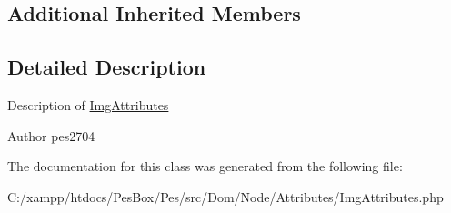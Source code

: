 \subsection*{Additional Inherited Members}


\subsection{Detailed Description}
Description of \mbox{\hyperlink{class_pes_1_1_dom_1_1_node_1_1_attributes_1_1_img_attributes}{Img\+Attributes}}

\begin{DoxyAuthor}{Author}
pes2704 
\end{DoxyAuthor}


The documentation for this class was generated from the following file\+:\begin{DoxyCompactItemize}
\item 
C\+:/xampp/htdocs/\+Pes\+Box/\+Pes/src/\+Dom/\+Node/\+Attributes/Img\+Attributes.\+php\end{DoxyCompactItemize}
